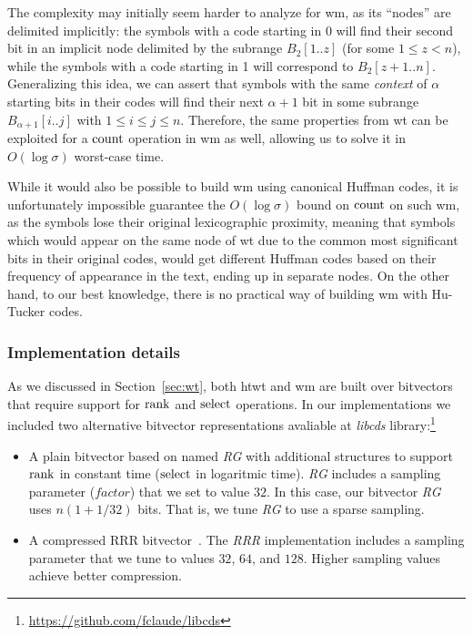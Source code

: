 	The complexity may initially seem harder to analyze for \gls{wm}, as its ``nodes'' are delimited implicitly: the symbols with a code starting in 0 will find their second bit in an implicit node delimited by the subrange $B_2[1..z]$ (for some $1 \leq z < n$), while the symbols with a code starting in 1 will correspond to $B_2[z+1..n]$. Generalizing this idea, we can assert that symbols with the same \textit{context} of $\alpha$ starting bits in their codes will find their next $\alpha+1$ bit in some subrange $B_{\alpha+1}[i..j]$ with $1 \leq i \leq j \leq n$. Therefore, the same properties from \gls{wt} can be exploited for a $\operatorname{count}$ operation in \gls{wm} as well, allowing us to solve it in $O(\log\sigma)$ worst-case time.

	While it would also be possible to build \gls{wm} using canonical Huffman codes, it is unfortunately impossible guarantee the $O(\log\sigma)$ bound on $\operatorname{count}$ on such \gls{wm}, as the symbols lose their original lexicographic proximity, meaning that symbols which would appear on the same node of \gls{wt} due to the common most significant bits in their original codes, would get different Huffman codes based on their frequency of appearance in the text, ending up in separate nodes. On the other hand, to our best knowledge, there is no practical way of building \gls{wm} with Hu-Tucker codes.

	\subsubsection{Implementation details} 
	As we discussed in Section~\ref{sec:wt}, both \gls{htwt} and \gls{wm} are built over bitvectors that require support for $\operatorname{rank}$ and $\operatorname{select}$ operations. In our implementations we included two alternative bitvector representations avaliable
	at {\em libcds} library:{\footnote{\url{https://github.com/fclaude/libcds}}}
	
	\begin{itemize}
		\item A plain bitvector based on \cite{Mun96} named {\em RG} with 
		additional structures to support $\operatorname{rank}$ in constant time ($\operatorname{select}$ in logaritmic time).
		{\em RG} includes a sampling parameter ($factor$) that we set to value $32$. In this case,
		our  bitvector {\em RG} uses $n (1+1/32)$ bits. That is, we tune {\em RG} to use a sparse sampling. 
			
		\item A compressed RRR bitvector~\cite{Raman:2002:SID:545381.545411}. The {\em RRR} implementation includes
		a sampling parameter that we tune to values $32$, $64$, and $128$. Higher sampling values achieve better compression.
	\end{itemize}


